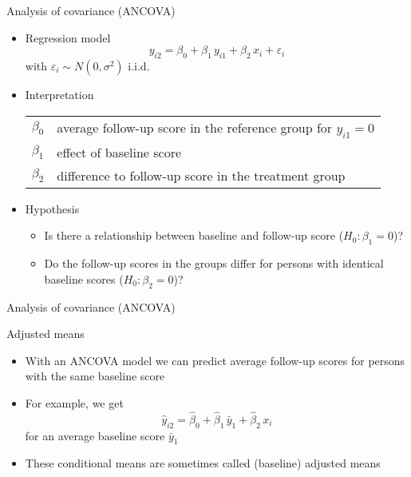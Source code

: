 \documentclass{beamer}
\begin{document}
\begin{frame}{Analysis of covariance (ANCOVA)}
\begin{itemize}
  \item Regression model
    \[
      y_{i2} = \beta_0 + \beta_1 \, y_{i1} + \beta_2 \, x_i + \varepsilon_i
    \]
    with $\varepsilon_i \sim N(0, \sigma^2)$ i.i.d.
  \item Interpretation
    \begin{tabular}{lp{10cm}}
    $\beta_0$ & average follow-up score in the reference group for $y_{i1} = 0$\\
    $\beta_1$ & effect of baseline score\\
    $\beta_2$ & difference to follow-up score in the treatment group
    \end{tabular}
  \item Hypothesis
    \begin{itemize}
        \item Is there a relationship between baseline and follow-up score ($H_0\colon \beta_1 = 0$)?
        \item Do the follow-up scores in the groups differ for persons with
          identical baseline scores ($H_0\colon \beta_2 = 0$)?
    \end{itemize}
\end{itemize}
\end{frame}


\begin{frame}{Analysis of covariance (ANCOVA)}
\begin{center}
\end{center}
\end{frame}


\begin{frame}{Adjusted means}
\begin{itemize}
  \item With an ANCOVA model we can predict average follow-up scores for
    persons with the same baseline score
  \item For example, we get
    \[
      \hat{y}_{i2} = \hat{\beta}_0 + \hat{\beta}_1 \, \bar{y}_1 +
                     \hat{\beta}_2 \, x_i
    \]
    for an average baseline score $\bar{y}_1$
\item These conditional means are sometimes called (baseline) adjusted
  means
\end{itemize}
\end{frame}
\end{document}
